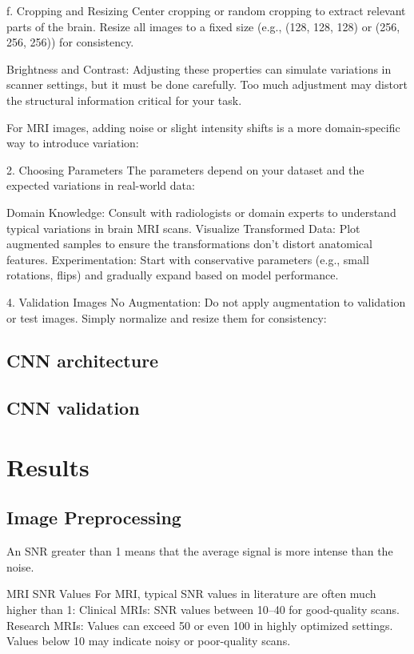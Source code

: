 f. Cropping and Resizing
Center cropping or random cropping to extract relevant parts of the brain.
Resize all images to a fixed size (e.g., (128, 128, 128) or (256, 256, 256)) for consistency.

Brightness and Contrast: Adjusting these properties can simulate variations in scanner settings, but it must be done carefully. Too much adjustment may distort the structural information critical for your task.

For MRI images, adding noise or slight intensity shifts is a more domain-specific way to introduce variation:


2. Choosing Parameters
The parameters depend on your dataset and the expected variations in real-world data:

Domain Knowledge: Consult with radiologists or domain experts to understand typical variations in brain MRI scans.
Visualize Transformed Data: Plot augmented samples to ensure the transformations don't distort anatomical features.
Experimentation: Start with conservative parameters (e.g., small rotations, flips) and gradually expand based on model performance.

4. Validation Images
No Augmentation: Do not apply augmentation to validation or test images. Simply normalize and resize them for consistency:

%
\subsection{CNN architecture}

%
\subsection{CNN validation}

\section{Results}

\subsection{Image Preprocessing}

An SNR greater than 1 means that the average signal is more intense than the noise.

MRI SNR Values
For MRI, typical SNR values in literature are often much higher than 1:
Clinical MRIs: SNR values between 10–40 for good-quality scans.
Research MRIs: Values can exceed 50 or even 100 in highly optimized settings.
Values below 10 may indicate noisy or poor-quality scans.

